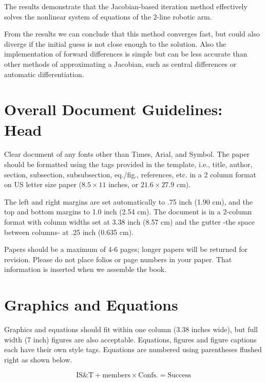 \documentclass[letterpaper,twocolumn,fleqn]{article}
\begin{document}
\noindent The results demonstrate that the Jacobian-based iteration method effectively solves the nonlinear system of equations of the 2-line robotic arm.
\vspace{0.1in}

\noindent From the results we can conclude that this method converges fast, but could also diverge if the initial guess is not close enough to the solution. Also the implementation of forward differences is simple but can be less accurate than other methods of approximating a Jacobian, such as central differences or automatic differentiation.


\clearpage
\section{Overall Document Guidelines: Head}
\label{sec:intro}

Clear document of any fonts other than Times, Arial, and Symbol. The
paper should be formatted using the tags provided in the template,
i.e., title, author, section, subsection, subsubsection, eq./fig.,
references, etc.  in a 2 column format on US letter size paper ($8.5
\times 11$ inches, or $21.6 \times 27.9$ cm).

The left and right margins are set automatically to .75 inch (1.90 cm),
and the top and bottom margins to 1.0 inch (2.54 cm). The document is in
a 2-column format with column widths set at 3.38 inch (8.57 cm) and the
gutter -the space between columns- at .25 inch (0.635 cm).

Papers should be a maximum of 4-6 pages; longer papers will be
returned for revision. Please do not place folios or page numbers in
your paper. That information is inserted when we assemble the book.


\section{Graphics and Equations}
Graphics and equations should fit within one column (3.38 inches
wide), but full width (7 inch) figures are also acceptable. Equations,
figures and figure captions each have their own style tags. Equations
are numbered using parentheses flushed right as shown below.

\begin{equation}
\label{eq:ist}
\textrm{IS\&T} + \textrm{members} \times \textrm{Confs.} = \textrm{Success}
\end{equation}
\end{document}
